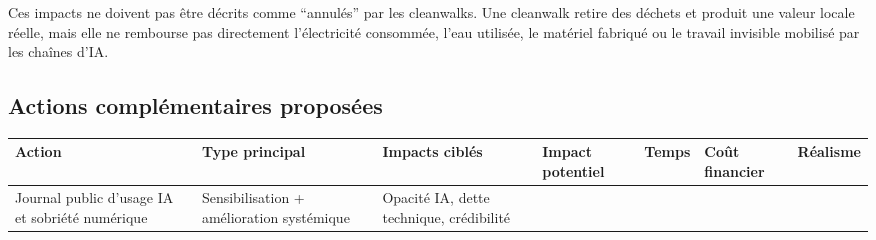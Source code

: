 \documentclass[
  10pt,
  a4paper,
  DIV=11,
  numbers=noendperiod,
  oneside]{scrreprt}
\newcounter{none} %
\begin{document}
Ces impacts ne doivent pas être décrits comme ``annulés'' par les
cleanwalks. Une cleanwalk retire des déchets et produit une valeur
locale réelle, mais elle ne rembourse pas directement l'électricité
consommée, l'eau utilisée, le matériel fabriqué ou le travail invisible
mobilisé par les chaînes d'IA.

\subsection{Actions complémentaires
proposées}\label{actions-compluxe9mentaires-proposuxe9es}

{\def\LTcaptype{none} %
\begin{longtable}[]{@{}
  >{\raggedright\arraybackslash}p{}
  >{\raggedright\arraybackslash}p{}
  >{\raggedright\arraybackslash}p{}
  >{\raggedright\arraybackslash}p{}
  >{\raggedright\arraybackslash}p{}
  >{\raggedright\arraybackslash}p{}
  >{\raggedright\arraybackslash}p{}@{}}
\toprule\noalign{}
\begin{minipage}[b]{\linewidth}\raggedright
Action
\end{minipage} & \begin{minipage}[b]{\linewidth}\raggedright
Type principal
\end{minipage} & \begin{minipage}[b]{\linewidth}\raggedright
Impacts ciblés
\end{minipage} & \begin{minipage}[b]{\linewidth}\raggedright
Impact potentiel
\end{minipage} & \begin{minipage}[b]{\linewidth}\raggedright
Temps
\end{minipage} & \begin{minipage}[b]{\linewidth}\raggedright
Coût financier
\end{minipage} & \begin{minipage}[b]{\linewidth}\raggedright
Réalisme
\end{minipage} \\
\midrule\noalign{}
\endhead
\bottomrule\noalign{}
\endlastfoot
Journal public d'usage IA et sobriété numérique & Sensibilisation +
amélioration systémique & Opacité IA, dette technique, crédibilité &

\end{longtable}}
\end{document}
